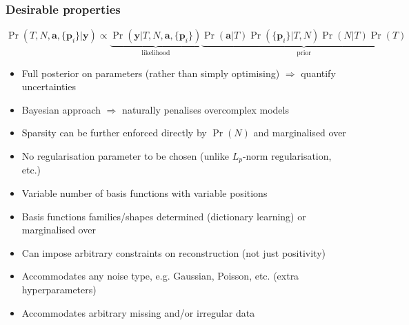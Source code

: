 \documentclass[%
    9pt,
]{beamer}
\newcommand{\vect}[1]{\mathbf{#1}}
\newcommand{\red}[1]{\textcolor{cambblue}{#1}}
\newcommand{\rr}{\Rightarrow}
\begin{document}
\begin{frame}
    \frametitle{Desirable properties}

    $\Pr(T,N,\vect{a},\{\vect{p}_i\}|\vect{y})
    \propto \underbrace{\Pr(\vect{y}|T,N,\vect{a},\{\vect{p}_i\})}_{\mbox{likelihood}}
    \underbrace{\Pr(\vect{a}|T)\Pr(\{\vect{p}_i\}|T,N)
    \Pr(N|T)\Pr(T)}_{\mbox{prior}}$


    \begin{itemize}
        \item  \red{Full posterior} on parameters 
            (rather than simply optimising) $\rr$ quantify \red{uncertainties}

        \item Bayesian approach $\rr$ naturally penalises \red{overcomplex} models 

        \item \red{Sparsity} can be further \red{enforced directly} by
            $\Pr(N)$ and \red{marginalised over}

        \item No \red{regularisation parameter} to be chosen
            (unlike $L_p$-norm regularisation, etc.)

        \item \red{Variable number} of basis functions with \red{variable positions}

        \item Basis functions \red{families/shapes} determined
            (dictionary learning) or \red{marginalised over}


        \item Can impose \red{arbitrary constraints} on reconstruction 
            (not just positivity)

        \item Accommodates \red{any noise type}, e.g. Gaussian,
            Poisson, etc. (extra \red{hyperparameters})


        \item Accommodates arbitrary \red{missing} and/or \red{irregular} data 

    \end{itemize}
\end{frame}
\end{document}
